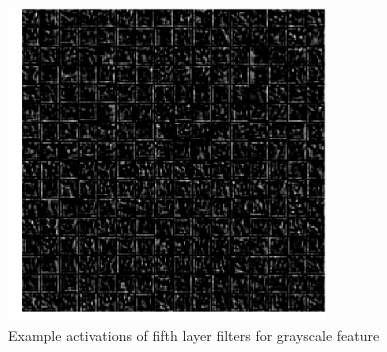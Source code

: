 \begin{figure}
\centering
\includegraphics[width=0.75\textwidth]{images/conv5_activations_image1.png}
\caption{Example activations of fifth layer filters for grayscale feature}
\label{fig:conv5_activations}
\end{figure}
